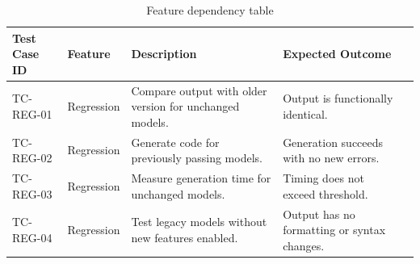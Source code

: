 \bgroup
{}
\begin{xltabular}{\textwidth}{X X X X X}
\caption{Feature dependency table}
\label{tab:reg_tests_1}\\
\toprule
{}%
Test Case ID & Feature & Description & Expected Outcome \\
\midrule
TC-REG-01 & Regression & Compare output with older version for unchanged models. & Output is functionally identical. \\
TC-REG-02 & Regression & Generate code for previously passing models. & Generation succeeds with no new errors. \\
TC-REG-03 & Regression & Measure generation time for unchanged models. & Timing does not exceed threshold. \\
TC-REG-04 & Regression & Test legacy models without new features enabled. & Output has no formatting or syntax changes. \\
\end{xltabular}




